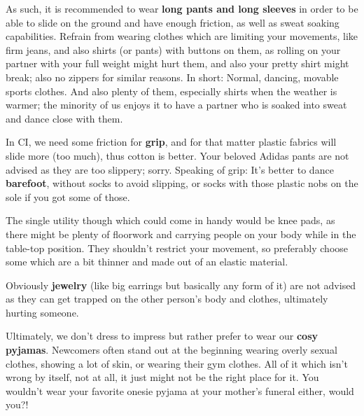 As such, it is recommended to wear \textbf{long pants and long sleeves} in order to be able to slide on the ground and have enough friction, as well as sweat soaking capabilities.
Refrain from wearing clothes which are limiting your movements, like firm jeans, and also shirts (or pants) with buttons on them, as rolling on your partner with your full weight might hurt them, and also your pretty shirt might break; also no zippers for similar reasons.
In short: Normal, dancing, movable sports clothes.
And also plenty of them, especially shirts when the weather is warmer; the minority of us enjoys it to have a partner who is soaked into sweat and dance close with them.

In CI, we need some friction for \textbf{grip}, and for that matter plastic fabrics will slide more (too much), thus cotton is better.
Your beloved Adidas pants are not advised as they are too slippery; sorry.
Speaking of grip: It's better to dance \textbf{barefoot}, without socks to avoid slipping, or socks with those plastic nobs on the sole if you got some of those.

The single utility though which could come in handy would be knee pads, as there might be plenty of floorwork and carrying people on your body while in the table-top position.
They shouldn't restrict your movement, so preferably choose some which are a bit thinner and made out of an elastic material.

Obviously \textbf{jewelry} (like big earrings but basically any form of it) are not advised as they can get trapped on the other person's body and clothes, ultimately hurting someone.

Ultimately, we don't dress to impress but rather prefer to wear our \textbf{cosy pyjamas}.
Newcomers often stand out at the beginning wearing overly sexual clothes, showing a lot of skin, or wearing their gym clothes.
All of it which isn't wrong by itself, not at all, it just might not be the right place for it.
You wouldn't wear your favorite onesie pyjama at your mother's funeral either, would you?!
